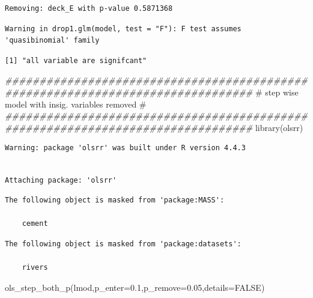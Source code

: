 \documentclass[
  letterpaper,
  DIV=11,
  numbers=noendperiod]{scrartcl}
\newenvironment{Shaded}{\begin{snugshade}}{\end{snugshade}}
\newcommand{\AttributeTok}[1]{\textcolor[rgb]{0.40,0.45,0.13}{#1}}
\newcommand{\CommentTok}[1]{\textcolor[rgb]{0.37,0.37,0.37}{#1}}
\newcommand{\ConstantTok}[1]{\textcolor[rgb]{0.56,0.35,0.01}{#1}}
\newcommand{\DocumentationTok}[1]{\textcolor[rgb]{0.37,0.37,0.37}{\textit{#1}}}
\newcommand{\FloatTok}[1]{\textcolor[rgb]{0.68,0.00,0.00}{#1}}
\newcommand{\FunctionTok}[1]{\textcolor[rgb]{0.28,0.35,0.67}{#1}}
\newcommand{\NormalTok}[1]{\textcolor[rgb]{0.00,0.23,0.31}{#1}}
\begin{document}
\begin{verbatim}
Removing: deck_E with p-value 0.5871368 
\end{verbatim}

\begin{verbatim}
Warning in drop1.glm(model, test = "F"): F test assumes 'quasibinomial' family
\end{verbatim}

\begin{verbatim}
[1] "all variable are signifcant"
\end{verbatim}

\begin{Shaded}
\begin{Highlighting}[]
\DocumentationTok{\#\#\#\#\#\#\#\#\#\#\#\#\#\#\#\#\#\#\#\#\#\#\#\#\#\#\#\#\#\#\#\#\#\#\#\#\#\#\#\#\#\#\#\#\#\#\#\#\#\#\#\#\#\#\#\#\#\#\#\#\#\#\#\#\#\#\#\#\#\#\#\#\#\#\#\#\#\#\#\#}
\CommentTok{\#                step wise model with insig. variables removed                 \# }
\DocumentationTok{\#\#\#\#\#\#\#\#\#\#\#\#\#\#\#\#\#\#\#\#\#\#\#\#\#\#\#\#\#\#\#\#\#\#\#\#\#\#\#\#\#\#\#\#\#\#\#\#\#\#\#\#\#\#\#\#\#\#\#\#\#\#\#\#\#\#\#\#\#\#\#\#\#\#\#\#\#\#\#\#}
\FunctionTok{library}\NormalTok{(olsrr)}
\end{Highlighting}
\end{Shaded}

\begin{verbatim}
Warning: package 'olsrr' was built under R version 4.4.3
\end{verbatim}

\begin{verbatim}

Attaching package: 'olsrr'
\end{verbatim}

\begin{verbatim}
The following object is masked from 'package:MASS':

    cement
\end{verbatim}

\begin{verbatim}
The following object is masked from 'package:datasets':

    rivers
\end{verbatim}

\begin{Shaded}
\begin{Highlighting}[]
\FunctionTok{ols\_step\_both\_p}\NormalTok{(lmod,}\AttributeTok{p\_enter=}\FloatTok{0.1}\NormalTok{,}\AttributeTok{p\_remove=}\FloatTok{0.05}\NormalTok{,}\AttributeTok{details=}\ConstantTok{FALSE}\NormalTok{)}
\end{Highlighting}
\end{Shaded}
\end{document}
